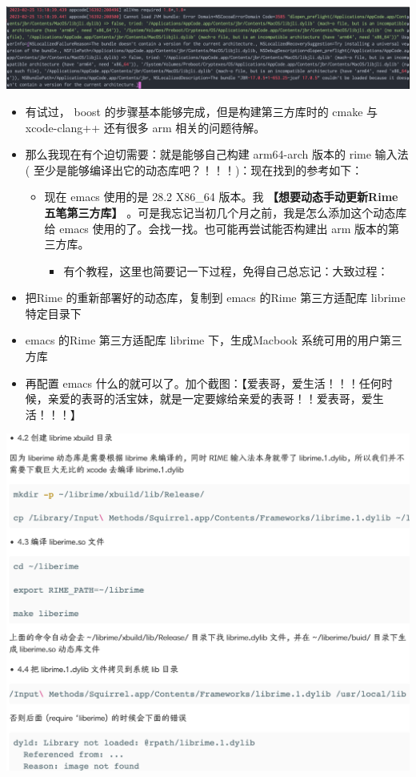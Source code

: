 \documentclass[9pt, b5paper]{article}
\begin{document}
\includegraphics[width=.9\linewidth]{./pic/readme_20230225_132052.png}
\begin{itemize}
\item 有试过， boost 的步骤基本能够完成，但是构建第三方库时的 cmake 与 xcode-clang++ 还有很多 arm 相关的问题待解。
\item 那么我现在有个迫切需要：就是能够自己构建 arm64-arch 版本的 rime 输入法( 至少是能够编译出它的动态库吧？！！！)：现在找到的参考如下： 
\begin{itemize}
\item 现在 emacs 使用的是 28.2 X86\_64 版本。我 \textbf{【想要动态手动更新Rime 五笔第三方库】} 。可是我忘记当初几个月之前，我是怎么添加这个动态库给 emacs 使用的了。会找一找。也可能再尝试能否构建出 arm 版本的第三方库。
\begin{itemize}
\item 有个教程，这里也简要记一下过程，免得自己总忘记：大致过程：
\end{itemize}
\end{itemize}
\item 把Rime 的重新部署好的动态库，复制到 emacs 的Rime 第三方适配库 librime 特定目录下
\item emacs 的Rime 第三方适配库 librime 下，生成Macbook 系统可用的用户第三方库
\item 再配置 emacs 什么的就可以了。加个截图：【爱表哥，爱生活！！！任何时候，亲爱的表哥的活宝妹，就是一定要嫁给亲爱的表哥！！爱表哥，爱生活！！！】
\end{itemize}

\includegraphics[width=.9\linewidth]{./pic/readme_20230718_111929.png}
\end{document}
